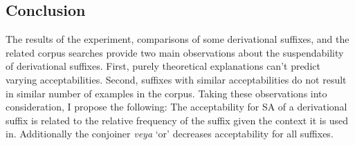 \subsection{Conclusion}
The results of the experiment, comparisons of some derivational suffixes, and the related corpus searches provide two main observations about the suspendability of derivational suffixes. First, purely theoretical explanations can't predict varying acceptabilities. Second, suffixes with similar acceptabilities do not result in similar number of examples in the corpus. Taking these observations into consideration, I propose the following: The acceptability for SA of a derivational suffix is related to the relative frequency of the suffix given the context it is used in. Additionally the conjoiner \textit{veya} `or' decreases acceptability for all suffixes.











